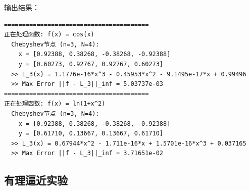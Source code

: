 \documentclass[UTF8, a4paper, 11pt]{ctexart}
\begin{document}
输出结果：
\begin{lstlisting}
========================================
正在处理函数: f(x) = cos(x)
  Chebyshev节点 (n=3, N=4):
    x = [0.92388, 0.38268, -0.38268, -0.92388]
    y = [0.60273, 0.92767, 0.92767, 0.60273]
  >> L_3(x) = 1.1776e-16*x^3 - 0.45953*x^2 - 9.1495e-17*x + 0.99496
  >> Max Error ||f - L_3||_inf = 5.03737e-03
========================================
正在处理函数: f(x) = ln(1+x^2)
  Chebyshev节点 (n=3, N=4):
    x = [0.92388, 0.38268, -0.38268, -0.92388]
    y = [0.61710, 0.13667, 0.13667, 0.61710]
  >> L_3(x) = 0.67944*x^2 - 1.711e-16*x + 1.5701e-16*x^3 + 0.037165
  >> Max Error ||f - L_3||_inf = 3.71651e-02
\end{lstlisting}
\subsection{有理逼近实验}
\end{document}
